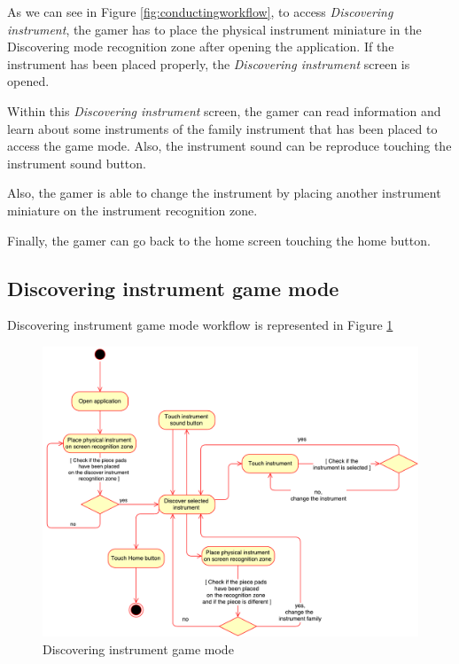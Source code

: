 As we can see in Figure \ref{fig:conductingworkflow}, to access \textit{Discovering instrument}, the gamer has to place the physical instrument miniature in the Discovering mode recognition zone after opening the application. If the instrument has been placed properly, the \textit{Discovering instrument} screen is opened.

Within this \textit{Discovering instrument} screen, the gamer can read information and learn about some instruments of the family instrument that has been placed to access the game mode. Also, the instrument sound can be reproduce touching the instrument sound button.

Also, the gamer is able to change the instrument by placing another instrument miniature on the instrument recognition zone.

Finally, the gamer can go back to the home screen touching the home button.

\FloatBarrier

\newpage
\subsection{Discovering instrument game mode}
\label{subsec:discoverinstrument_arch}

Discovering instrument game mode workflow is represented in Figure \ref{fig:discoveringworkflow}

\begin{figure}[ht!]
	\centering
	\includegraphics[width=400pt]{graphics/architecture/DiscoveringGameMode.pdf}
	\caption{Discovering instrument game mode}
	\label{fig:discoveringworkflow}
\end{figure}

